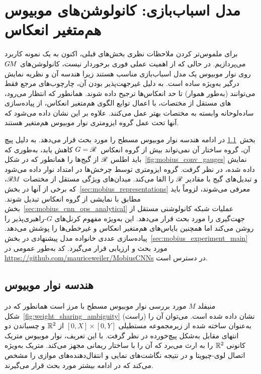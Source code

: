 
\section{مدل اسباب‌بازی: کانولوشن‌های موبیوس هم‌متغیر انعکاس}
\label{sec:mobius_conv}

برای ملموس‌تر کردن ملاحظات نظری بخش‌های قبلی، اکنون به یک نمونه کاربرد می‌پردازیم.
در حالی که از اهمیت عملی فوری برخوردار نیست، کانولوشن‌های $G\mkern-1.4muM$ روی نوار موبیوس یک مدل اسباب‌بازی مناسب هستند زیرا هندسه آن و نظریه نمایش درگیر به‌ویژه ساده است.
به دلیل غیرجهت‌پذیر بودن آن، چارچوب‌های مرجع فقط می‌توانند (به‌طور هموار) تا حد انعکاس‌ها ترجیح داده شوند.
همانطور که انتظار می‌رود، \CNN های مستقل از مختصات، با اعمال توابع الگوی هم‌متغیر انعکاس، از پیاده‌سازی ساده‌لوحانه وابسته به مختصات بهتر عمل می‌کنند.
علاوه بر این نشان داده می‌شود که آنها تحت عمل گروه ایزومتری نوار موبیوس هم‌متغیر هستند.

\etocsettocstyle{}{} %
\localtableofcontents

بخش~\ref{sec:mobius_geometry} در ادامه هندسه نوار موبیوس مسطح را مورد بحث قرار می‌دهد.
به دلیل پیچ آن، گروه ساختار آن نمی‌تواند بیش از گروه انعکاس~$G=\mathscr{R}$ کاهش یابد، به‌طوری که باید اطلس $\mathscr{R}$ از گیج‌ها را همانطور که در شکل~\ref{fig:mobius_conv_gauges} نمایش داده شده، در نظر گرفت.
گروه ایزومتری توسط چرخش‌ها در امتداد نوار داده می‌شود و تبدیل‌های گیج با مقادیر $\mathscr{R}$ را القا می‌کند.
میدان‌های ویژگی مستقل از مختصات $\mathscr{R}\mkern-1.8muM$، که برخی از آنها در بخش~\ref{sec:mobius_representations} معرفی می‌شوند، لزوماً باید مطابق با نمایشی از گروه انعکاس تبدیل شوند.
بخش~\ref{sec:mobius_cnn_ops_analytical} عملیات شبکه کانولوشنی مستقل از جهت‌گیری را مورد بحث قرار می‌دهد.
این به‌ویژه مفهوم کرنل‌های $G$-راهبری‌پذیر را روشن می‌کند اما همچنین بایاس‌های هم‌متغیر انعکاس و غیرخطی‌ها را پوشش می‌دهد.
پیاده‌سازی عددی خانواده مدل پیشنهادی در بخش~\ref{sec:mobius_experiment_main} مورد بحث و ارزیابی قرار می‌گیرد.
کد به‌طور عمومی در \url{https://github.com/mauriceweiler/MobiusCNNs} در دسترس است.



\subsection{هندسه نوار موبیوس}
\label{sec:mobius_geometry}

منیفلد $M$ مورد بررسی نوار موبیوس مسطح با مرز است همانطور که در شکل~\ref{fig:weight_sharing_ambiguity} (راست) نشان داده شده است.
می‌توان آن را به‌عنوان ساخته شده از زیرمجموعه مستطیلی $[0,X] \times [0,Y]$ از $\mathbb{R}^2$ و چسباندن دو انتهای مقابل به‌شکل پیچ‌خورده در نظر گرفت.
با این تعریف، نوار موبیوس متریک کانونی $\mathbb{R}^2$ را به ارث می‌برد که آن را با ساختار ریمانی مجهز می‌کند.
متریک به‌ویژه اتصال لوی-چیویتا و در نتیجه نگاشت‌های نمایی و انتقال‌دهنده‌های موازی را مشخص می‌کند که در ادامه بیشتر مورد بحث قرار می‌گیرند.

